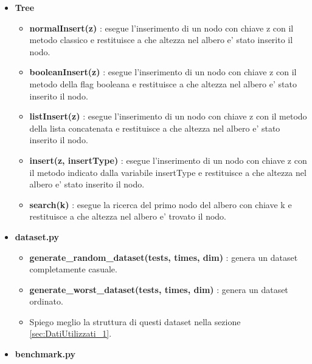 \begin{itemize}

    \item \textbf{Tree}
    \begin{itemize}
    
        \item \textbf{normalInsert(z)} : esegue l'inserimento di un nodo con chiave z con il metodo classico e restituisce a che altezza nel albero e' stato inserito il nodo.
        
        \item \textbf{booleanInsert(z)} : esegue l'inserimento di un nodo con chiave z con il metodo della flag booleana e restituisce a che altezza nel albero e' stato inserito il nodo.
        
        \item \textbf{listInsert(z)} : esegue l'inserimento di un nodo con chiave z con il metodo della lista concatenata e restituisce a che altezza nel albero e' stato inserito il nodo.
        
        \item \textbf{insert(z, insertType)} : esegue l'inserimento di un nodo con chiave z con il metodo indicato dalla variabile insertType e restituisce a che altezza nel albero e' stato inserito il nodo.
        
        \item \textbf{search(k)} : esegue la ricerca del primo nodo del albero con chiave k e restituisce a che altezza nel albero e' trovato il nodo.
                
    \end{itemize}
    
    \item \textbf{dataset.py}
    \begin{itemize}
        \item \textbf{generate\_random\_dataset(tests, times, dim)} : genera un dataset completamente casuale.
        
        \item \textbf{generate\_worst\_dataset(tests, times, dim)} : genera un dataset ordinato.
        
        \item Spiego meglio la struttura di questi dataset nella sezione \ref{sec:DatiUtilizzati_1}.
        
    \end{itemize}
    
    \item \textbf{benchmark.py}
    \begin{itemize}
    

\end{itemize}
\end{itemize}
